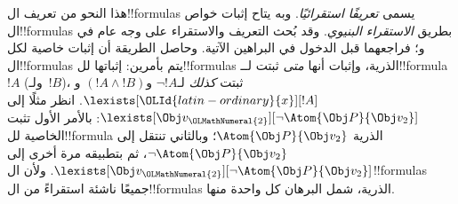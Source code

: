 \documentclass[../../../include/open-logic-section]{subfiles}
\begin{document}
هذا النحو من تعريف ال!!{formula}s يسمى \emph{تعريفًا استقرائيًا}.
وبه يتاح إثبات خواص ال!!{formula}s بطريق \emph{الاستقراء البنيوي}.
وقد بُحث التعريف والاستقراء على وجه عام في
 و؛
فراجعهما قبل الدخول في البراهين الآتية. وحاصل الطريقة أن إثبات
خاصية لكل ال!!{formula}s يتم بأمرين: إثباتها لل!!{formula}s
الذرية، وإثبات أنها \emph{متى} ثبتت لــ!!{formula}~$!A$
(ولـ~$!B$)، ثبتت \emph{كذلك} لـ$\lnot !A$ و$(!A \land !B)$
و$\lexists[\OLId{latin-ordinary}{x}][!A]$. انظر مثلًا إلى
$\lexists[\Obj v_\OLMathNumeral{2}][\lnot \Atom{\Obj P}{\Obj v_2}]$:
بالأمر الأول تثبت الخاصية لل!!{formula} الذرية
$\Atom{\Obj P}{\Obj v_2}$؛ وبالثاني تنتقل إلى
$\lnot \Atom{\Obj P}{\Obj v_2}$، ثم بتطبيقه مرة أخرى إلى
$\lexists[\Obj v_\OLMathNumeral{2}][\lnot \Atom{\Obj P}{\Obj v_2}]$.
ولأن ال!!{formula}s جميعًا ناشئة استقراءً من ال!!{formula}s
الذرية، شمل البرهان كل واحدة منها.
\end{document}
